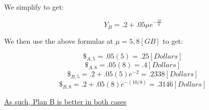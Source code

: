 \begin{enumerate}
    We simplify to get:

    $$\boxed{Y_B=.2+.05\mu e^{-\frac{10}{\mu}}}$$

    We then use the above formulas at $\mu=5,8[\si{GB}]$ to get:

    $$\$_{A,5}=.05(5)=.25[\si{Dollars}]$$
    $$\$_{A,8}=.05(8)=.4[\si{Dollars}]$$
    $$\$_{B,5}=.2+.05(5)e^{-2}=.2338[\si{Dollars}]$$
    $$\$_{B,8}=.2+.05(8)e^{-(10/8)}=.3146[\si{Dollars}]$$

    \underline{As such, Plan B is better in both cases}

\end{enumerate}



